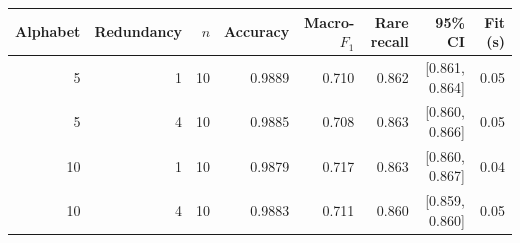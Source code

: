 \begin{tabular}{@{}rrrrrrrr@{}}
\toprule
Alphabet & Redundancy & $n$ & Accuracy & Macro-$F_1$ & Rare recall & 95\% CI & Fit (s) \\
\midrule
5 & 1 & 10 & 0.9889 & 0.710 & 0.862 & [0.861, 0.864] & 0.05 \\
5 & 4 & 10 & 0.9885 & 0.708 & 0.863 & [0.860, 0.866] & 0.05 \\
10 & 1 & 10 & 0.9879 & 0.717 & 0.863 & [0.860, 0.867] & 0.04 \\
10 & 4 & 10 & 0.9883 & 0.711 & 0.860 & [0.859, 0.860] & 0.05 \\
\bottomrule
\end{tabular}
